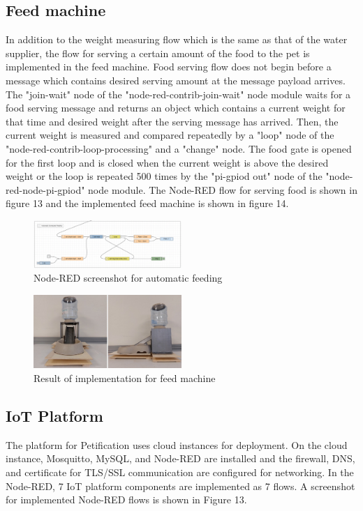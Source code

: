 \documentclass[conference]{IEEEtran}
\begin{document}
\subsection{Feed machine}
In addition to the weight measuring flow which is the same as that of the water supplier, the flow for serving a certain amount of the food to the pet is implemented in the feed machine.
Food serving flow does not begin before a message which contains desired serving amount at the message payload arrives.
The "join-wait" node of the "node-red-contrib-join-wait" node module waits for a food serving message and returns an object which contains a current weight for that time and desired weight after the serving message has arrived.
Then, the current weight is measured and compared repeatedly by a "loop" node of the "node-red-contrib-loop-processing" and a "change" node.
The food gate is opened for the first loop and is closed when the current weight is above the desired weight or the loop is repeated 500 times by the "pi-gpiod out" node of the "node-red-node-pi-gpiod" node module.
The Node-RED flow for serving food is shown in figure 13 and the implemented feed machine is shown in figure 14.

\begin{figure}[htbp]
\centerline{\includegraphics[width=0.5\textwidth]{./images/automaticFeeding.png}}
\caption{Node-RED screenshot for automatic feeding}
\label{fig}
\end{figure}

\begin{figure}[htbp]
\centerline{\includegraphics[width=0.5\textwidth]{./images/feed-machine.jpg}}
\caption{Result of implementation for feed machine}
\label{fig}
\end{figure}

\subsection{IoT Platform}
The platform for Petification uses cloud instances for deployment.
On the cloud instance, Mosquitto, MySQL, and Node-RED are installed and the firewall, DNS, and certificate for TLS/SSL communication are configured for networking.
In the Node-RED, 7 IoT platform components are implemented as 7 flows.
A screenshot for implemented Node-RED flows is shown in Figure 13.
\end{document}
